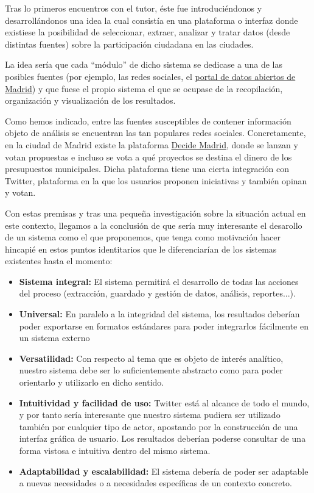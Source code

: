 Tras lo primeros encuentros con el tutor, éste fue introduciéndonos y desarrollándonos una idea la cual consistía en una plataforma o interfaz donde existiese la posibilidad de seleccionar, extraer, analizar y tratar datos (desde distintas fuentes) sobre la participación ciudadana en las ciudades.

La idea sería que cada ``módulo'' de dicho sistema se dedicase a una de las posibles fuentes (por ejemplo, las redes sociales, el \href{https://datos.madrid.es/portal/site/egob/}{portal de datos abiertos de Madrid}) y que fuese el propio sistema el que se ocupase de la recopilación, organización y visualización de los resultados.

Como hemos indicado, entre las fuentes susceptibles de contener información objeto de análisis se encuentran las tan populares redes sociales. Concretamente, en la ciudad de Madrid existe la plataforma \href{https://decide.madrid.es/}{Decide Madrid}, donde se lanzan y votan propuestas e incluso se vota a qué proyectos se destina el dinero de los presupuestos municipales. Dicha plataforma tiene una cierta integración con Twitter, plataforma en la que los usuarios proponen iniciativas y también opinan y votan.

Con estas premisas y tras una pequeña investigación sobre la situación actual en este contexto, llegamos a la conclusión de que sería muy interesante el desarollo de un sistema como el que proponemos, que tenga como motivación hacer hincapié en estos puntos identitarios que le diferenciarían de los sistemas existentes hasta el momento:

\begin{itemize}
	\item \textbf{Sistema integral:} El sistema permitirá el desarrollo de todas las acciones del proceso (extracción, guardado y gestión de datos, análisis, reportes...). 
	\item \textbf{Universal:} En paralelo a la integridad del sistema, los resultados deberían poder exportarse en formatos estándares para poder integrarlos fácilmente en un sistema externo
	\item \textbf{Versatilidad:} Con respecto al tema que es objeto de interés analítico, nuestro sistema debe ser lo suficientemente abstracto como para poder orientarlo y utilizarlo en dicho sentido.
	\item \textbf{Intuitividad y facilidad de uso:} Twitter está al alcance de todo el mundo, y por tanto sería interesante que nuestro sistema pudiera ser utilizado también por cualquier tipo de actor, apostando por la construcción de una interfaz gráfica de usuario. Los resultados deberían poderse consultar de una forma vistosa e intuitiva dentro del mismo sistema.
	\item \textbf{Adaptabilidad y escalabilidad:} El sistema debería de poder ser adaptable a nuevas necesidades o a necesidades específicas de un contexto concreto. 
\end{itemize}

